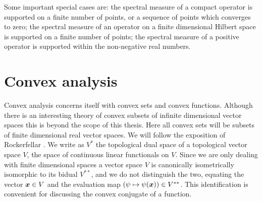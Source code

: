 Some important special cases are: the spectral measure of a compact operator is supported on a finite number of points, or a sequence of points which converges to zero; the spectral measure of an operator on a finite dimensional Hilbert space is supported on a finite number of points; the spectral measure of a positive operator is supported within the non-negative real numbers.

\section{Convex analysis}

Convex analysis concerns itself with convex sets and convex functions. Although there is an interesting theory of convex subsets of infinite dimensional vector spaces  this is beyond the scope of this thesis. Here all convex sets will be subsets of finite dimensional real vector spaces. We will follow the exposition of Rockerfellar \cite{rtr-conv-anal-book}. We write as $V^*$ the topological dual space of a topological vector space $V$, the space of continuous linear functionals on $V$. Since we are only dealing with finite dimensional spaces a vector space $V$ is canonically isometrically isomorphic to its bidual $V^{**}$, and we do not distinguish the two, equating the vector $\bm{x}\in V$ and the evaluation map $(\psi\mapsto\psi(\bm{x}))\in V^{**}$. This identification is convenient for discussing the convex conjugate of a function.


